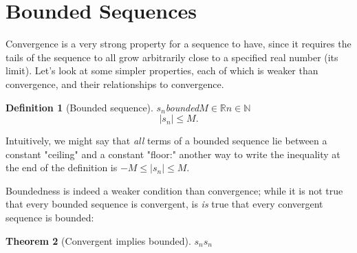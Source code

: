 \documentclass[10pt,]{article}
\theoremstyle{plain}
\newtheorem{theorem}{Theorem}[section]
\theoremstyle{definition}
\newtheorem{definition}[theorem]{Definition}
\numberwithin{equation}{section}
\begin{document}
\section[{Bounded Sequences}]{Bounded Sequences}\label{section-bounded}
\hypertarget{p-3}{}%
Convergence is a very strong property for a sequence to have, since it requires the tails of the sequence to all grow arbitrarily close to a specified real number (its limit). Let's look at some simpler properties, each of which is weaker than convergence, and their relationships to convergence.%
\begin{definition}[{Bounded sequence}]\label{definition-1}
\(s_n\)\emph{bounded}\(M \in\mathbb{R}\)\(n \in\mathbb{N}\)%
\begin{equation*}
|s_n| \leq M.
\end{equation*}
\end{definition}
\hypertarget{p-4}{}%
Intuitively, we might say that \emph{all} terms of a bounded sequence lie between a constant "ceiling" and a constant "floor:" another way to write the inequality at the end of the definition is \(-M \leq |s_n| \leq M.\)%
\par
\hypertarget{p-5}{}%
Boundedness is indeed a weaker condition than convergence; while it is not true that every bounded sequence is convergent, is \emph{is} true that every convergent sequence is bounded:%
\begin{theorem}[{Convergent implies bounded}]\label{theorem-1}
\(s_n\)\(s_n\)\end{theorem}
\end{document}
